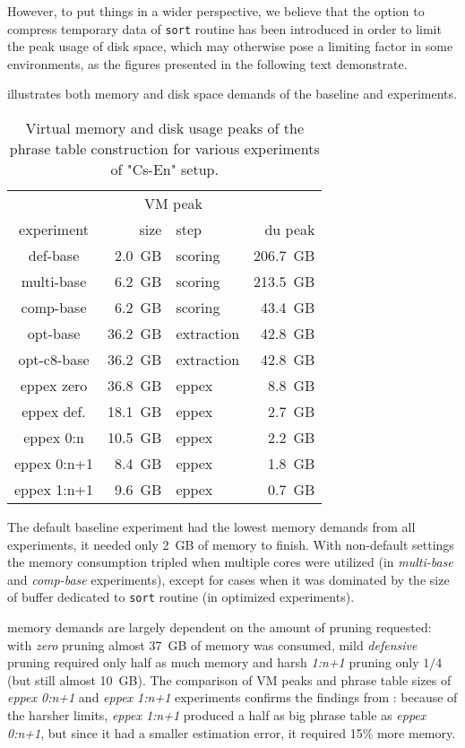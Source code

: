 However, to put things in a wider perspective, we believe that the option to compress temporary data of
\texttt{sort} routine has been introduced in order to limit the peak usage of disk space, which may
otherwise pose a limiting factor in some environments, as the figures presented in the following text
demonstrate.

 illustrates both memory and disk space demands of the baseline
and \eppex{} experiments.

\begin{table}[ht]
\centering
\begin{tabular}{ | c | r l | r | }
\hline
 & \multicolumn{2}{|c|}{VM peak} & \\
experiment & size & step & du peak \\
\hline
\hline
def-base       &  2.0~GB &    scoring & 206.7~GB \\
multi-base     &  6.2~GB &    scoring & 213.5~GB \\
comp-base      &  6.2~GB &    scoring &  43.4~GB \\
opt-base       & 36.2~GB & extraction &  42.8~GB \\
opt-c8-base    & 36.2~GB & extraction &  42.8~GB \\
eppex zero     & 36.8~GB &      eppex &   8.8~GB \\
\hline
eppex def.     & 18.1~GB &      eppex &   2.7~GB \\
eppex 0:n      & 10.5~GB &      eppex &   2.2~GB \\
eppex 0:n+1    &  8.4~GB &      eppex &   1.8~GB \\
eppex 1:n+1    &  9.6~GB &      eppex &   0.7~GB \\
\hline
\end{tabular}
\caption{\label{cs-en-wmt13-vm-and-disk-usage-peaks}
Virtual memory and disk usage peaks of the phrase table construction for various experiments of "Cs-En" setup.}
\end{table}

The default baseline experiment had the lowest memory demands from all experiments, it needed only 2~GB
of memory to finish.
With non-default settings the memory consumption tripled when multiple cores were utilized (in \emph{multi-base}
and \emph{comp-base} experiments), except for cases when it was dominated by the size of buffer dedicated
to \texttt{sort} routine (in optimized experiments).

\Eppex{} memory demands are largely dependent on the amount of pruning requested: with \emph{zero}
pruning almost 37~GB of memory was consumed, mild \emph{defensive} pruning required only half as much
memory and harsh \emph{1:n+1} pruning only $1/4$ (but still almost 10~GB).
The comparison of VM peaks and phrase table sizes of \emph{eppex 0:n+1} and \emph{eppex 1:n+1}
experiments confirms the findings from :
because of the harsher limits, \emph{eppex 1:n+1} produced a half as big phrase table as \emph{eppex 0:n+1},
but since it had a smaller estimation error, it required 15\% more memory.

